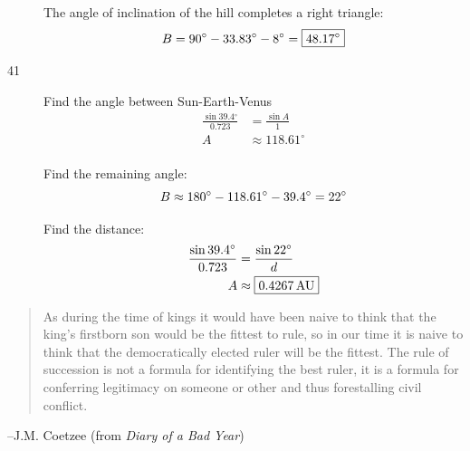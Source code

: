 \documentclass{exam}
\newcommand{\dg}{\ensuremath{^\circ}}
\begin{document}
\begin{description}
        The angle of inclination of the hill completes a right triangle:
        \[
          B = 90 \dg - 33.83 \dg - 8 \dg = \boxed{ 48.17 \dg } \\
        \]

      \item[41] 
        Find the angle between Sun-Earth-Venus
        \begin{align*}
          \frac{\sin 39.4 \dg}{0.723} & = \frac{\sin A}{1} \\
          A                     & \approx 118.61 \dg \\
        \end{align*}

        Find the remaining angle:
        \[
          B \approx 180 \dg - 118.61 \dg - 39.4 \dg = 22 \dg \\
        \]

        Find the distance:
        \begin{align*}
          \frac{\sin 39.4 \dg}{0.723} & = \frac{\sin 22 \dg}{d} \\
          A                     & \approx \boxed{ \unit[0.4267]{AU} } \\
        \end{align*}

    \end{description}

  \else
    \vspace{1 cm}
    \begin{quote}
      \begin{em}
        As during the time of kings it would have been naive to think that the king's firstborn son would be the fittest to
        rule, so in our time it is naive to think that the democratically elected ruler will be the fittest. The rule of
        succession is not a formula for identifying the best ruler, it is a formula for conferring legitimacy on someone or
        other and thus forestalling civil conflict.
      \end{em}
    \end{quote}
    \hspace{1.5 cm} --J.M. Coetzee (from {\em Diary of a Bad Year})
  \fi
\end{document}
